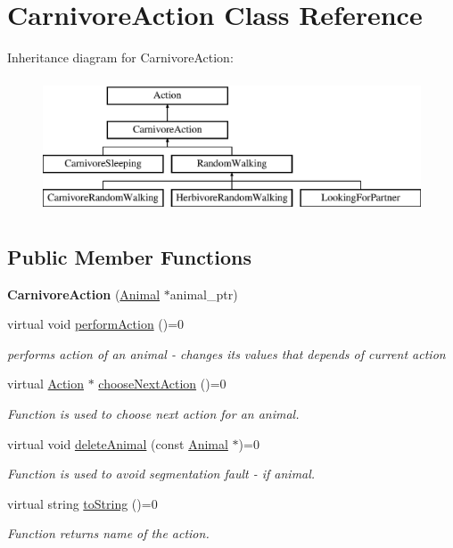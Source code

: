 \hypertarget{class_carnivore_action}{}\section{Carnivore\+Action Class Reference}
\label{class_carnivore_action}
Inheritance diagram for Carnivore\+Action\+:\begin{figure}[H]
\begin{center}
\leavevmode
\includegraphics[height=4.000000cm]{class_carnivore_action}
\end{center}
\end{figure}
\subsection*{Public Member Functions}
\begin{DoxyCompactItemize}
\item 
\hypertarget{class_carnivore_action_a0d83784d9df308959871ade0908f07dd}{}{\bfseries Carnivore\+Action} (\hyperlink{class_animal}{Animal} $\ast$animal\+\_\+ptr)\label{class_carnivore_action_a0d83784d9df308959871ade0908f07dd}

\item 
virtual void \hyperlink{class_carnivore_action_ae396f2f07131c21813e7986be130438e}{perform\+Action} ()=0
\begin{DoxyCompactList}\small\item\em performs action of an animal -\/ changes it\textquotesingle{}s values that depends of current action \end{DoxyCompactList}\item 
virtual \hyperlink{class_action}{Action} $\ast$ \hyperlink{class_carnivore_action_ae16f836240641508899939c33f9dffd7}{choose\+Next\+Action} ()=0
\begin{DoxyCompactList}\small\item\em Function is used to choose next action for an animal. \end{DoxyCompactList}\item 
virtual void \hyperlink{class_carnivore_action_aedd1918537fb9cf3172ec86cbab062af}{delete\+Animal} (const \hyperlink{class_animal}{Animal} $\ast$)=0
\begin{DoxyCompactList}\small\item\em Function is used to avoid segmentation fault -\/ if animal. \end{DoxyCompactList}\item 
virtual string \hyperlink{class_carnivore_action_a2c955f0de63b624b23d15e913060bf2a}{to\+String} ()=0
\begin{DoxyCompactList}\small\item\em Function returns name of the action. \end{DoxyCompactList}\end{DoxyCompactItemize}
